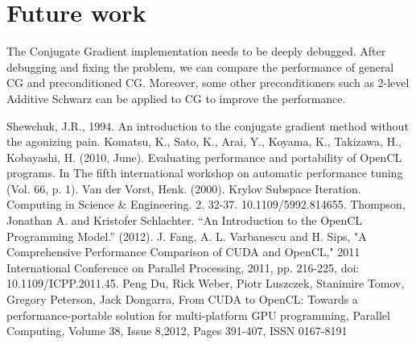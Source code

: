 \documentclass[times]{TRR}
\begin{document}
\section{Future work}
The Conjugate Gradient implementation needs to be deeply debugged. After debugging and fixing the problem, we can compare the performance of general CG and preconditioned CG. Moreover, some other preconditioners such as 2-level Additive Schwarz can be applied to CG to improve the performance.
\begin{thebibliography}{99}


Shewchuk, J.R., 1994. An introduction to the conjugate gradient method without the agonizing pain.
Komatsu, K., Sato, K., Arai, Y., Koyama, K., Takizawa, H., Kobayashi, H. (2010, June). Evaluating performance and portability of OpenCL programs. In The fifth international workshop on automatic performance tuning (Vol. 66, p. 1).
Van der Vorst, Henk. (2000). Krylov Subspace Iteration. Computing in Science & Engineering. 2. 32-37. 10.1109/5992.814655. 
Thompson, Jonathan A. and Kristofer Schlachter. “An Introduction to the OpenCL Programming Model.” (2012).
J. Fang, A. L. Varbanescu and H. Sips, "A Comprehensive Performance Comparison of CUDA and OpenCL," 2011 International Conference on Parallel Processing, 2011, pp. 216-225, doi: 10.1109/ICPP.2011.45.
Peng Du, Rick Weber, Piotr Luszczek, Stanimire Tomov, Gregory Peterson, Jack Dongarra,
From CUDA to OpenCL: Towards a performance-portable solution for multi-platform GPU programming,
Parallel Computing, Volume 38, Issue 8,2012, Pages 391-407, ISSN 0167-8191
\end{thebibliography}
\end{document}
